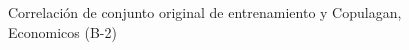 \begin{figure}[H]
    \centering
    
    \caption{Correlación de conjunto original de entrenamiento y Copulagan, Economicos (B-2)}
    \label{pairwise-economicos-b-2-copulagan}
\end{figure}